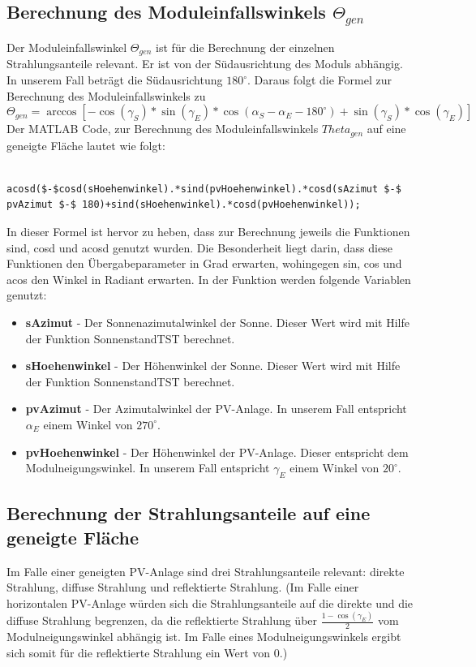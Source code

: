 \documentclass[a4paper,12pt]{article}
\begin{document}
	\subsection{Berechnung des Moduleinfallswinkels $\Theta_{gen}$}
	Der Moduleinfallswinkel $\Theta_{gen}$ ist für die Berechnung der einzelnen Strahlungsanteile relevant. Er ist von der Südausrichtung des Moduls abhängig.\\
	In unserem Fall beträgt die Südausrichtung $180^{\circ}$. Daraus folgt die Formel zur Berechnung des Moduleinfallswinkels zu
	\begin{equation}
		\Theta_{gen} = \arccos{[-\cos{(\gamma_S)}*\sin{(\gamma_E)}*\cos{(\alpha_S-\alpha_E-180^{\circ})}+\sin{(\gamma_S)}*\cos{(\gamma_E)}]}
	\end{equation}
	Der MATLAB Code, zur Berechnung des Moduleinfallswinkels $Theta_{gen}$ auf eine geneigte Fläche lautet wie folgt:
	\begin{lstlisting}
		acosd($-$cosd(sHoehenwinkel).*sind(pvHoehenwinkel).*cosd(sAzimut $-$ pvAzimut $-$ 180)+sind(sHoehenwinkel).*cosd(pvHoehenwinkel));
	\end{lstlisting}
	In dieser Formel ist hervor zu heben, dass zur Berechnung jeweils die Funktionen sind, cosd und acosd genutzt wurden. Die Besonderheit liegt darin, dass diese Funktionen den Übergabeparameter in Grad erwarten, wohingegen sin, cos und acos den Winkel in Radiant erwarten.\newline
	In der Funktion werden folgende Variablen genutzt:
	\begin{itemize}
		\item \textbf{sAzimut} - Der Sonnenazimutalwinkel der Sonne. Dieser Wert wird mit Hilfe der Funktion SonnenstandTST berechnet.
		\item \textbf{sHoehenwinkel} - Der Höhenwinkel der Sonne. Dieser Wert wird mit Hilfe der Funktion SonnenstandTST berechnet.
		\item \textbf{pvAzimut} - Der Azimutalwinkel der PV-Anlage. In unserem Fall entspricht $\alpha_E$ einem Winkel von $270^{\circ}$.
		\item \textbf{pvHoehenwinkel} - Der Höhenwinkel der PV-Anlage. Dieser entspricht dem Modulneigungswinkel. In unserem Fall entspricht $\gamma_E$ einem Winkel von $20^{\circ}$.
	\end{itemize}
	\subsection{Berechnung der Strahlungsanteile auf eine geneigte Fläche}
	Im Falle einer geneigten PV-Anlage sind drei Strahlungsanteile relevant: direkte Strahlung, diffuse Strahlung und reflektierte Strahlung. (Im Falle einer horizontalen PV-Anlage würden sich die Strahlungsanteile auf die direkte und die diffuse Strahlung begrenzen, da die reflektierte Strahlung über $\frac{1-\cos{(\gamma_E)}}{2}$ vom Modulneigungswinkel abhängig ist. Im Falle eines Modulneigungswinkels ergibt sich somit für die reflektierte Strahlung ein Wert von $0$.)
\end{document}
